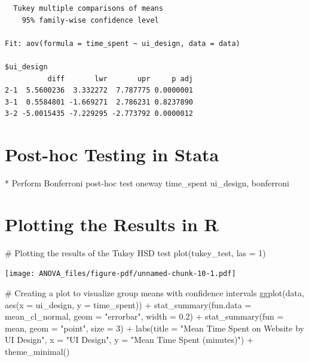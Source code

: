 \documentclass[
  letterpaper,
  DIV=11,
  numbers=noendperiod]{scrreprt}
\newenvironment{Shaded}{\begin{snugshade}}{\end{snugshade}}
\newcommand{\AttributeTok}[1]{\textcolor[rgb]{0.40,0.45,0.13}{#1}}
\newcommand{\CommentTok}[1]{\textcolor[rgb]{0.37,0.37,0.37}{#1}}
\newcommand{\DecValTok}[1]{\textcolor[rgb]{0.68,0.00,0.00}{#1}}
\newcommand{\FloatTok}[1]{\textcolor[rgb]{0.68,0.00,0.00}{#1}}
\newcommand{\FunctionTok}[1]{\textcolor[rgb]{0.28,0.35,0.67}{#1}}
\newcommand{\KeywordTok}[1]{\textcolor[rgb]{0.00,0.23,0.31}{#1}}
\newcommand{\NormalTok}[1]{\textcolor[rgb]{0.00,0.23,0.31}{#1}}
\newcommand{\SpecialCharTok}[1]{\textcolor[rgb]{0.37,0.37,0.37}{#1}}
\newcommand{\StringTok}[1]{\textcolor[rgb]{0.13,0.47,0.30}{#1}}
\begin{document}
\begin{verbatim}
  Tukey multiple comparisons of means
    95% family-wise confidence level

Fit: aov(formula = time_spent ~ ui_design, data = data)

$ui_design
          diff       lwr       upr     p adj
2-1  5.5600236  3.332272  7.787775 0.0000001
3-1  0.5584801 -1.669271  2.786231 0.8237890
3-2 -5.0015435 -7.229295 -2.773792 0.0000012
\end{verbatim}

\section{Post-hoc Testing in Stata}\label{post-hoc-testing-in-stata}

\begin{Shaded}
\begin{Highlighting}[]
\NormalTok{* Perform Bonferroni }\KeywordTok{post}\NormalTok{{-}hoc }\KeywordTok{test}
\KeywordTok{oneway}\NormalTok{ time\_spent ui\_design, bonferroni}
\end{Highlighting}
\end{Shaded}

\section{Plotting the Results in R}\label{plotting-the-results-in-r}

\begin{Shaded}
\begin{Highlighting}[]
\CommentTok{\# Plotting the results of the Tukey HSD test}
\FunctionTok{plot}\NormalTok{(tukey\_test, }\AttributeTok{las =} \DecValTok{1}\NormalTok{)}
\end{Highlighting}
\end{Shaded}

\texttt{[image: ANOVA\_files/figure-pdf/unnamed-chunk-10-1.pdf]}

\begin{Shaded}
\begin{Highlighting}[]
\CommentTok{\# Creating a plot to visualize group means with confidence intervals}
\FunctionTok{ggplot}\NormalTok{(data, }\FunctionTok{aes}\NormalTok{(}\AttributeTok{x =}\NormalTok{ ui\_design, }\AttributeTok{y =}\NormalTok{ time\_spent)) }\SpecialCharTok{+}
  \FunctionTok{stat\_summary}\NormalTok{(}\AttributeTok{fun.data =}\NormalTok{ mean\_cl\_normal, }\AttributeTok{geom =} \StringTok{"errorbar"}\NormalTok{, }\AttributeTok{width =} \FloatTok{0.2}\NormalTok{) }\SpecialCharTok{+}
  \FunctionTok{stat\_summary}\NormalTok{(}\AttributeTok{fun =}\NormalTok{ mean, }\AttributeTok{geom =} \StringTok{"point"}\NormalTok{, }\AttributeTok{size =} \DecValTok{3}\NormalTok{) }\SpecialCharTok{+}
  \FunctionTok{labs}\NormalTok{(}\AttributeTok{title =} \StringTok{"Mean Time Spent on Website by UI Design"}\NormalTok{,}
       \AttributeTok{x =} \StringTok{"UI Design"}\NormalTok{,}
       \AttributeTok{y =} \StringTok{"Mean Time Spent (minutes)"}\NormalTok{) }\SpecialCharTok{+}
  \FunctionTok{theme\_minimal}\NormalTok{()}
\end{Highlighting}
\end{Shaded}
\end{document}
